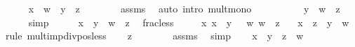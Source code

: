 \begin{isabellebody}
\ \ \ \ \isamarkupfalse%
\ {\isachardoublequoteopen}x\ {\isacharasterisk}{\kern0pt}\ w\ {\isasymle}\ y\ {\isacharasterisk}{\kern0pt}\ z{\isachardoublequoteclose}\isanewline
\ \ \ \ \ \ \isamarkupfalse%
\ assms\ \isamarkupfalse%
\ {\isacharparenleft}{\kern0pt}auto\ intro{\isacharcolon}{\kern0pt}\ mult{\isacharunderscore}{\kern0pt}mono{\isacharparenright}{\kern0pt}\isanewline
\ \ \isamarkupfalse%
\isanewline
\ \ \isamarkupfalse%
\ \isamarkupfalse%
\ {\isachardoublequoteopen}{\isachardot}{\kern0pt}{\isachardot}{\kern0pt}{\isachardot}{\kern0pt}\ {\isacharequal}{\kern0pt}\ y\ {\isacharslash}{\kern0pt}\ w\ {\isacharasterisk}{\kern0pt}\ z{\isachardoublequoteclose}\isanewline
\ \ \ \ \isamarkupfalse%
\ simp\isanewline
\ \ \isamarkupfalse%
\ \isamarkupfalse%
\ {\isachardoublequoteopen}x\ {\isasymle}\ y\ {\isacharslash}{\kern0pt}\ w\ {\isacharasterisk}{\kern0pt}\ z{\isachardoublequoteclose}\ \isacommand{{\isachardot}{\kern0pt}}\isamarkupfalse%
\isanewline
{}\isamarkupfalse%
%
\endisatagproof
{\isafoldproof}%
%
\isadelimproof
\isanewline
%
\endisadelimproof
\isanewline
{}\isamarkupfalse%
\ frac{\isacharunderscore}{\kern0pt}less{\isacharcolon}{\kern0pt}\isanewline
\ \ \ {\isachardoublequoteopen}{}\ {\isasymle}\ x{\isachardoublequoteclose}\ {\isachardoublequoteopen}x\ {\isacharless}{\kern0pt}\ y{\isachardoublequoteclose}\ {\isachardoublequoteopen}{}\ {\isacharless}{\kern0pt}\ w{\isachardoublequoteclose}\ {\isachardoublequoteopen}w\ {\isasymle}\ z{\isachardoublequoteclose}\isanewline
\ \ \ {\isachardoublequoteopen}x\ {\isacharslash}{\kern0pt}\ z\ {\isacharless}{\kern0pt}\ y\ {\isacharslash}{\kern0pt}\ w{\isachardoublequoteclose}\isanewline
%
\isadelimproof
%
\endisadelimproof
%
\isatagproof
{}\isamarkupfalse%
\ {\isacharparenleft}{\kern0pt}rule\ mult{\isacharunderscore}{\kern0pt}imp{\isacharunderscore}{\kern0pt}div{\isacharunderscore}{\kern0pt}pos{\isacharunderscore}{\kern0pt}less{\isacharparenright}{\kern0pt}\isanewline
\ \ \isamarkupfalse%
\ {\isachardoublequoteopen}z\ {\isachargreater}{\kern0pt}\ {}{\isachardoublequoteclose}\isanewline
\ \ \ \ \isamarkupfalse%
\ assms\ \isamarkupfalse%
\ simp\isanewline
\ \ \isamarkupfalse%
\ {\isachardoublequoteopen}x\ {\isacharless}{\kern0pt}\ y\ {\isacharasterisk}{\kern0pt}\ z\ {\isacharslash}{\kern0pt}\ w{\isachardoublequoteclose}\isanewline

\end{isabellebody}
